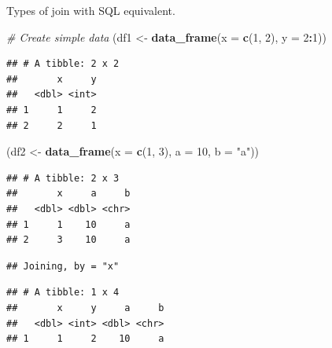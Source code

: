 \documentclass[]{book}
\newenvironment{Shaded}{\begin{snugshade}}{\end{snugshade}}
\newcommand{\KeywordTok}[1]{\textcolor[rgb]{0.13,0.29,0.53}{\textbf{#1}}}
\newcommand{\DataTypeTok}[1]{\textcolor[rgb]{0.13,0.29,0.53}{#1}}
\newcommand{\DecValTok}[1]{\textcolor[rgb]{0.00,0.00,0.81}{#1}}
\newcommand{\StringTok}[1]{\textcolor[rgb]{0.31,0.60,0.02}{#1}}
\newcommand{\CommentTok}[1]{\textcolor[rgb]{0.56,0.35,0.01}{\textit{#1}}}
\newcommand{\OperatorTok}[1]{\textcolor[rgb]{0.81,0.36,0.00}{\textbf{#1}}}
\newcommand{\NormalTok}[1]{#1}
\theoremstyle{definition}
\theoremstyle{definition}
\theoremstyle{definition}
\theoremstyle{remark}
\begin{document}
Types of join with SQL equivalent.

\begin{Shaded}
\begin{Highlighting}[]
\CommentTok{# Create simple data}
\NormalTok{(df1 <-}\StringTok{ }\KeywordTok{data_frame}\NormalTok{(}\DataTypeTok{x =} \KeywordTok{c}\NormalTok{(}\DecValTok{1}\NormalTok{, }\DecValTok{2}\NormalTok{), }\DataTypeTok{y =} \DecValTok{2}\OperatorTok{:}\DecValTok{1}\NormalTok{))}
\end{Highlighting}
\end{Shaded}

\begin{verbatim}
## # A tibble: 2 x 2
##       x     y
##   <dbl> <int>
## 1     1     2
## 2     2     1
\end{verbatim}

\begin{Shaded}
\begin{Highlighting}[]
\NormalTok{(df2 <-}\StringTok{ }\KeywordTok{data_frame}\NormalTok{(}\DataTypeTok{x =} \KeywordTok{c}\NormalTok{(}\DecValTok{1}\NormalTok{, }\DecValTok{3}\NormalTok{), }\DataTypeTok{a =} \DecValTok{10}\NormalTok{, }\DataTypeTok{b =} \StringTok{"a"}\NormalTok{))}
\end{Highlighting}
\end{Shaded}

\begin{verbatim}
## # A tibble: 2 x 3
##       x     a     b
##   <dbl> <dbl> <chr>
## 1     1    10     a
## 2     3    10     a
\end{verbatim}

\begin{Shaded}
\end{Shaded}

\begin{verbatim}
## Joining, by = "x"
\end{verbatim}

\begin{verbatim}
## # A tibble: 1 x 4
##       x     y     a     b
##   <dbl> <int> <dbl> <chr>
## 1     1     2    10     a
\end{verbatim}

\begin{Shaded}
\end{Shaded}
\end{document}
